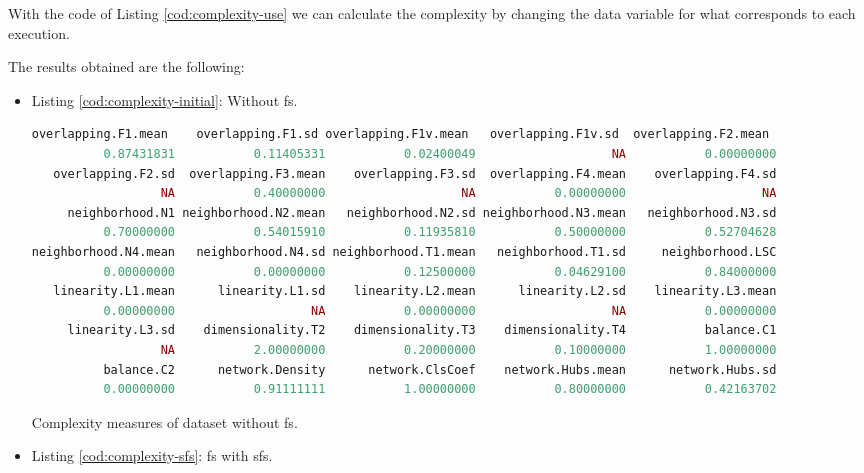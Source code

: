 With the code of Listing \ref{cod:complexity-use} we can calculate the complexity by changing the data variable for what corresponds to each execution.

The results obtained are the following:

\begin{itemize}
    \item Listing \ref{cod:complexity-initial}: Without \acrshort{fs}.
    
\begin{codefloat}[H]
\begin{lstlisting}[language=R, style=console]
 overlapping.F1.mean    overlapping.F1.sd overlapping.F1v.mean   overlapping.F1v.sd  overlapping.F2.mean 
          0.87431831           0.11405331           0.02400049                   NA           0.00000000 
   overlapping.F2.sd  overlapping.F3.mean    overlapping.F3.sd  overlapping.F4.mean    overlapping.F4.sd 
                  NA           0.40000000                   NA           0.00000000                   NA 
     neighborhood.N1 neighborhood.N2.mean   neighborhood.N2.sd neighborhood.N3.mean   neighborhood.N3.sd 
          0.70000000           0.54015910           0.11935810           0.50000000           0.52704628 
neighborhood.N4.mean   neighborhood.N4.sd neighborhood.T1.mean   neighborhood.T1.sd     neighborhood.LSC 
          0.00000000           0.00000000           0.12500000           0.04629100           0.84000000 
   linearity.L1.mean      linearity.L1.sd    linearity.L2.mean      linearity.L2.sd    linearity.L3.mean 
          0.00000000                   NA           0.00000000                   NA           0.00000000 
     linearity.L3.sd    dimensionality.T2    dimensionality.T3    dimensionality.T4           balance.C1 
                  NA           2.00000000           0.20000000           0.10000000           1.00000000 
          balance.C2      network.Density      network.ClsCoef    network.Hubs.mean      network.Hubs.sd 
          0.00000000           0.91111111           1.00000000           0.80000000           0.42163702 
\end{lstlisting}
\caption{Complexity measures of dataset without \acrshort{fs}.}
\label{cod:complexity-initial}
\end{codefloat}

    \item Listing \ref{cod:complexity-sfs}: \acrshort{fs} with \acrlong{sfs}.
    

\end{itemize}
